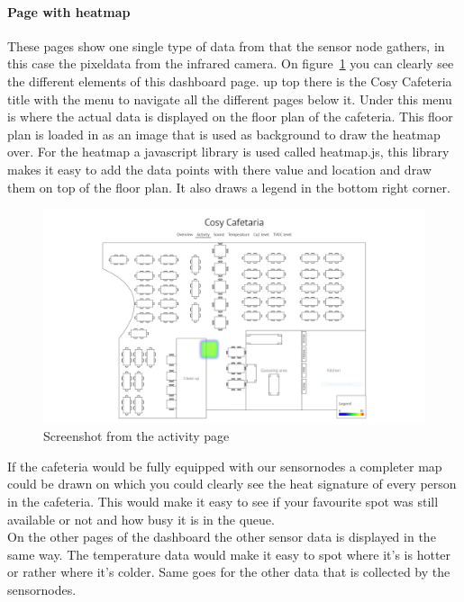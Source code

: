 \documentclass[11pt,a4paper]{article}
\begin{document}
\paragraph{Page with heatmap}
These pages show one single type of data from that the sensor node gathers, in this case the pixeldata from the infrared camera.
On figure~\ref{fig:heatmap_example} you can clearly see the different elements of this dashboard page. up top there is the Cosy Cafeteria title with the menu to navigate all the different pages below it.
Under this menu is where the actual data is displayed on the floor plan of the cafeteria. This floor plan is loaded in as an image that is used as background to draw the heatmap over.
For the heatmap a javascript library is used called heatmap.js, this library makes it easy to add the data points with there value and location and draw them on top of the floor plan.
It also draws a legend in the bottom right corner.
\begin{figure}[H]
	\centering
	\includegraphics[width=1.0\linewidth]{heatmapExample.png}
	\caption{Screenshot from the activity page}
	\label{fig:heatmap_example}
\end{figure}
If the cafeteria would be fully equipped with our sensornodes a completer map could be drawn on which you could clearly see the heat signature of every person in the cafeteria.
This would make it easy to see if your favourite spot was still available or not and how busy it is in the queue.
\\
On the other pages of the dashboard the other sensor data is displayed in the same way. 
The temperature data would make it easy to spot where it's is hotter or rather where it's colder.
Same goes for the other data that is collected by the sensornodes.
\end{document}
